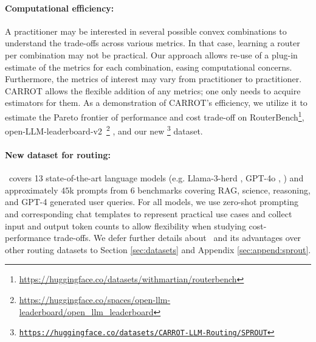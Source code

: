 
\paragraph{Computational efficiency:} A practitioner may be interested in several possible convex combinations to understand the trade-offs across various metrics. In that case, learning a router per combination may not be practical. Our approach allows re-use of a plug-in estimate of the metrics for each combination, easing computational concerns. Furthermore, the metrics of interest may vary from practitioner to practitioner. CARROT allows the flexible addition of any metrics; one only needs to acquire estimators for them. As a demonstration of CARROT's efficiency, we utilize it to estimate the Pareto frontier of performance and cost trade-off on 
{RouterBench}\footnote{\url{https://huggingface.co/datasets/withmartian/routerbench}}\citep{hu2024routerbench}, open-LLM-leaderboard-v2\
\footnote{\url{https://huggingface.co/spaces/open-llm-leaderboard/open\_llm\_leaderboard}} \citep{open-llm-leaderboard-v2}, and our new \newdata\footnote{\href{https://huggingface.co/datasets/CARROT-LLM-Routing/SPROUT}{\texttt{https://huggingface.co/datasets/CARROT-LLM-Routing/SPROUT}}} dataset.

\paragraph{New dataset for routing:} \newdata\ covers 13 state-of-the-art language models (e.g. Llama-3-herd \citep{grattafiori2024llama3herdmodels}, GPT-4o \citep{openai2024gpt4}, \etc ) and approximately $45$k prompts from 6 benchmarks covering RAG, science, reasoning, and GPT-4 generated user queries. For all models, we use zero-shot prompting and corresponding chat templates to represent practical use cases and collect input and output token counts to allow flexibility when studying cost-performance trade-offs. We defer further details about \newdata\ and its advantages over other routing datasets to Section \ref{sec:datasets} and Appendix \ref{sec:append:sprout}.

